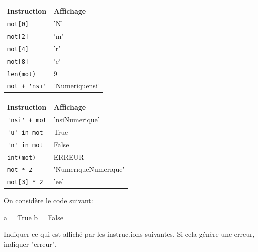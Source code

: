 \documentclass[a4paper,10pt]{report}
\renewcommand{\arraystretch}{1}  %
\def\ptsexoE{2}
\begin{document}
\renewcommand{\arraystretch}{1.2}
    \begin{tabular}{|p{3cm}|p{4cm}|}
        \hline
         Instruction & Affichage\\ \hline
         \verb|mot[0]|&'N'\\\hline
        \verb|mot[2]| &'m'\\\hline
        \verb|mot[4]| &'r'\\\hline
        \verb|mot[8]|&'e'\\\hline
        \verb|len(mot)|&9\\\hline
        \verb|mot + 'nsi'| &'Numeriquensi'\\\hline
        
        
    \end{tabular}\hfill
\renewcommand{\arraystretch}{1.2}
    \begin{tabular}{|p{3cm}|p{4cm}|}
        \hline
         Instruction & Affichage\\ \hline
        \verb|'nsi' + mot|&'nsiNumerique'\\\hline
        \verb|'u' in mot|&True\\\hline
        \verb|'n' in mot|&False\\\hline
        \verb|int(mot)|&ERREUR\\\hline
        \verb|mot * 2| &'NumeriqueNumerique'\\\hline
        \verb|mot[3] * 2| &'ee'\\\hline
        
        


    \end{tabular}

\bigskip

\exods{\ptsexoE}

On considère le code suivant:

\begin{CodePythontexAlt}[TaillePolice=\large,Largeur=1\linewidth,Centre,PremLigne=1]{}
a = True
b = False
\end{CodePythontexAlt}


Indiquer ce qui est affiché par les instructions suivantes. Si cela génère une erreur, indiquer "erreur".
\end{document}

